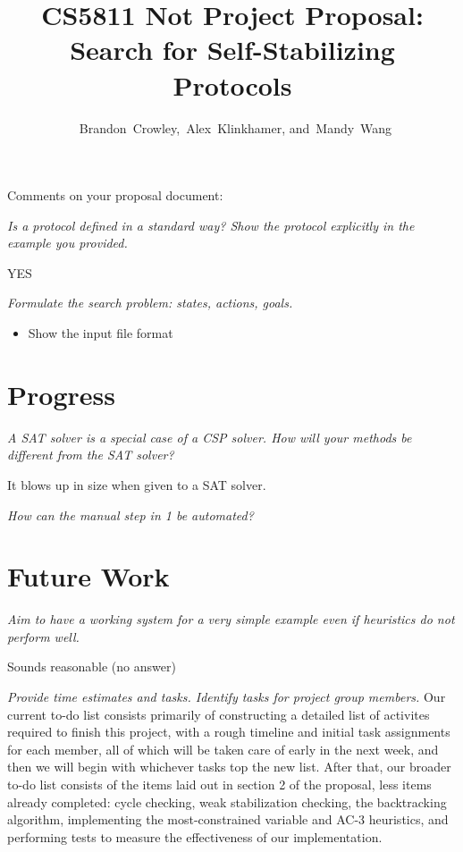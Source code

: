


\usepackage{tikz}
\usetikzlibrary{arrows}


\title{
 CS5811 Not Project Proposal:\\
 Search for Self-Stabilizing Protocols
}

\author{~Brandon~Crowley,~Alex~Klinkhamer, and~Mandy~Wang}
\maketitle



Comments on your proposal document:

{\it Is a protocol defined in a standard way? Show the protocol explicitly in the example you provided.}

YES

{\it Formulate the search problem: states, actions, goals.
\begin{itemize}
\item Show the input file format
\end{itemize}
}

\section{Progress}
{\it A SAT solver is a special case of a CSP solver. How will your methods be different from the SAT solver?}

It blows up in size when given to a SAT solver.

{\it How can the manual step in 1 be automated?}

\section{Future Work}

{\it Aim to have a working system for a very simple example even if heuristics do not perform well.}

Sounds reasonable (no answer)

{\it Provide time estimates and tasks. Identify tasks for project group members.}
Our current to-do list consists primarily of constructing a detailed list of activites required to finish this project, with a rough timeline 
and initial task assignments for each member, all of which will be taken care of early in the next week, and then we will begin with whichever tasks top
the new list.  After that, our broader to-do list consists of the items laid out in section 2 of the proposal, less items already completed:
cycle checking, weak stabilization checking, the backtracking algorithm, implementing the most-constrained variable and AC-3 heuristics, and performing
tests to measure the effectiveness of our implementation.

